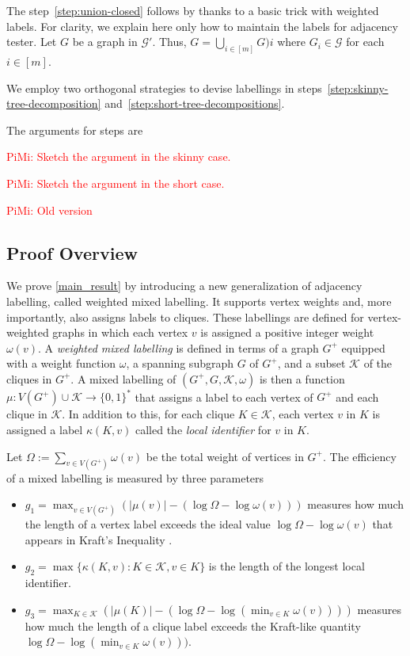 \documentclass{patmorin}
\newcommand{\piotr}[1]{\noindent\textcolor{red}{PiMi: #1}}
\newcommand{\defin}[1]{\emph{\textcolor{brightmaroon}{#1}}}
\newcommand{\calG}{\mathcal{G}}
\newcommand{\calK}{\mathcal{K}}
\begin{document}
The step~\ref{step:union-closed} follows by thanks to a basic trick with weighted labels. 
For clarity, we explain here only how to maintain the labels for adjacency tester. 
Let $G$ be a graph in $\calG'$. Thus, 
$G=\bigcup_{i\in[m]}G)i$ where $G_i\in\calG$ for each $i\in[m]$. 




We employ two orthogonal strategies to devise labellings in steps~\ref{step:skinny-tree-decomposition} and~\ref{step:short-tree-decompositions}.


The arguments for steps are 


\piotr{Sketch the argument in the skinny case.}

\piotr{Sketch the argument in the short case.}


\piotr{Old version}
\subsection{Proof Overview}
\label{ssec:overview}


We prove \cref{main_result} by introducing a new generalization of adjacency labelling, called weighted mixed labelling. It supports vertex weights and, more importantly, also assigns labels to cliques. These labellings are defined for vertex-weighted graphs in which each vertex $v$ is assigned a positive integer weight $\omega(v)$.  A \defin{weighted mixed labelling} is defined in terms of a graph $G^+$ equipped with a weight function $\omega$, a spanning subgraph $G$ of $G^+$, and a subset $\calK$ of the cliques in $G^+$. A mixed labelling of $(G^+,G,\calK,\omega)$ is then a function $\mu:V(G^+)\cup\calK\to\{0,1\}^*$ that assigns a label to each vertex of $G^+$ and each clique in $\calK$.  In addition to this, for each clique $K\in\calK$, each vertex $v$ in $K$ is assigned a label $\kappa(K,v)$ called the \defin{local identifier} for $v$ in $K$.

Let $\Omega:=\sum_{v\in V(G^+)}\omega(v)$ be the total weight of vertices in $G^+$.  The efficiency of a mixed labelling is measured by three parameters
\begin{itemize}
    \item $g_1=\max_{v\in V(G^+)} (|\mu(v)|-(\log\Omega - \log\omega(v)))$ measures how much the length of a vertex label exceeds the ideal value $\log\Omega-\log\omega(v)$ that appears in Kraft's Inequality \cite{Kraft1949}.
    \item $g_2=\max\{\kappa(K,v):K\in\calK, v\in K\}$ is the length of the longest local identifier.
    \item $g_3=\max_{K\in\calK} (|\mu(K)|-(\log\Omega - \log(\min_{v\in K}\omega(v))))$ measures how much the length of a clique label exceeds the Kraft-like quantity $\log\Omega - \log(\min_{v\in K}\omega(v)))$.
\end{itemize}
\end{document}
